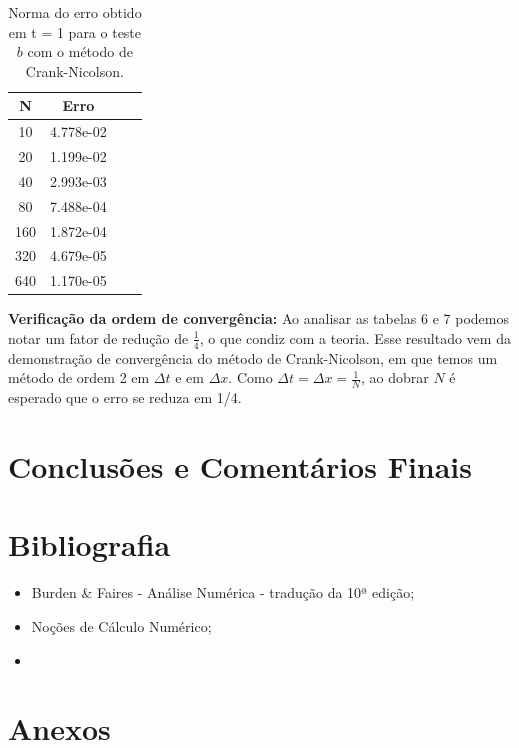 \documentclass[a4paper, 12pt]{article}
\begin{document}
\begin{table}[!h]
    \centering
    \begin{tabular}{|c|c|c|c|}
    \hline                               %
    N & Erro \\
    \hline
    10  & 4.778e-02  \\
    20  & 1.199e-02  \\
    40  & 2.993e-03  \\
    80  & 7.488e-04  \\
    160 & 1.872e-04  \\
    320 & 4.679e-05  \\
    640 & 1.170e-05  \\
    \hline
    \end{tabular}
    \caption{Norma do erro obtido em t = 1 para o teste $b$ com o método de Crank-Nicolson.}
\end{table}

\textbf{Verificação da ordem de convergência:} Ao analisar as tabelas 6 e 7 podemos notar um fator de redução de $\frac{1}{4}$, o que condiz com a teoria. Esse resultado vem da demonstração de convergência do método de Crank-Nicolson, em que temos um método de ordem 2 em $\Delta t$ e em $\Delta x$. Como $\Delta t = \Delta x = \frac{1}{N}$, ao dobrar $N$ é esperado que o erro se reduza em 1/4. 

\section{Conclusões e Comentários Finais}





\section{Bibliografia}
\begin{itemize}
	
	
	\item Burden \& Faires - Análise Numérica - tradução da 10ª edição;
	
	\item Noções de Cálculo Numérico;
	
	\item 

	
\end{itemize}

\section{Anexos}
\end{document}
